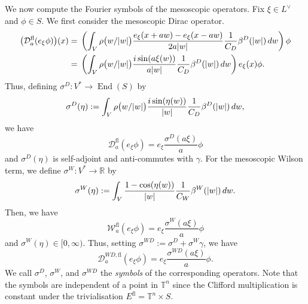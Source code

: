\documentclass[a4paper,oneside,12pt]{amsart}
\theoremstyle{plain}
\theoremstyle{definition}
\theoremstyle{remark}
\newcommand{\R}{\mathbb{R}}
\DeclarePairedDelimiter{\abs}{\lvert}{\rvert}
\DeclareMathOperator{\End}{End}
\newcommand{\flattorus}{\mathbb{T}^n}
\newcommand{\Lattice}{L}
\newcommand{\duallattice}[1]{#1^{\vee}}
\newcommand{\cliffordmultiplication}{\rho}
\newcommand{\mesoscopicDiracoperator}[1][a]{\mathcal{D}_{#1}}
\newcommand{\mesoscopicWilsonterm}[1][a]{\mathcal{W}_{#1}}
\newcommand{\cutoff}{\beta}
\newcommand{\cutoffDirac}{\cutoff^D}
\newcommand{\cutoffWilson}{\cutoff^W}
\newcommand{\symbolDirac}{\sigma^D}
\newcommand{\symbolWilson}{\sigma^W}
\newcommand{\symbolWilsonDirac}{\sigma^{\mathit{WD}}}
\newcommand{\flatmesoscopicDiracoperator}{\mesoscopicDiracoperator^{\mathrm{fl}}}
\newcommand{\flatmesoscopicWilsonterm}{\mesoscopicWilsonterm^{\mathrm{fl}}}
\newcommand{\flatmesoscopicWilsonDiracoperator}[1][a]{\mathcal{D}_{#1}^{\mathit{WD},\mathrm{fl}}}
\newcommand{\flatmodel}[1]{#1^{\mathrm{fl}}}
\begin{document}
We now compute the Fourier symbols of the mesoscopic operators.
Fix $\xi \in \duallattice{\Lattice}$ and $\phi \in S$.
We first consider the mesoscopic Dirac operator.
\begin{equation}
  \begin{aligned}
  \big(\flatmesoscopicDiracoperator (e_{\xi}\phi)\big)(x) ={}& \left(\int_V \cliffordmultiplication\big(w/\abs{w}\big) \frac{e_{\xi}(x+aw) - e_{\xi}(x-aw)}{2a\abs{w}} \frac{1}{C_D} \cutoffDirac(\abs{w}) \,dw\right) \phi \\
  ={}& \left(\int_V \cliffordmultiplication\big(w/\abs{w}\big) \frac{i \sin(a\xi(w))}{a\abs{w}} \frac{1}{C_D} \cutoffDirac(\abs{w}) \,dw\right) e_{\xi}(x)\phi.
  \end{aligned}
\end{equation}
Thus, defining $\symbolDirac \colon V^* \to \End(S)$ by
\begin{equation}
  \symbolDirac(\eta) := \int_V \cliffordmultiplication\big(w/\abs{w}\big) \frac{i \sin(\eta(w))}{\abs{w}} \frac{1}{C_D} \cutoffDirac(\abs{w}) \,dw,
\end{equation}
we have
\begin{equation}
  \flatmesoscopicDiracoperator (e_{\xi}\phi) = e_{\xi} \frac{\symbolDirac(a\xi)}{a} \phi
\end{equation}
and $\symbolDirac(\eta)$ is self-adjoint and anti-commutes with $\gamma$.
For the mesoscopic Wilson term, we define $\symbolWilson \colon V^* \to \R$ by
\begin{equation}
  \symbolWilson(\eta) := \int_V \frac{1 - \cos(\eta(w))}{\abs{w}} \frac{1}{C_W} \cutoffWilson(\abs{w}) \,dw.
\end{equation}
Then, we have
\begin{equation}
  \flatmesoscopicWilsonterm (e_{\xi}\phi) = e_{\xi} \frac{\symbolWilson(a\xi)}{a} \phi
\end{equation}
and $\symbolWilson(\eta) \in [0,\infty)$.
Thus, setting $\symbolWilsonDirac := \symbolDirac + \symbolWilson \gamma$, we have
\begin{equation}\label{equation: Fourier transform of mesoscopic WD operators}
  \flatmesoscopicWilsonDiracoperator (e_{\xi}\phi) = e_{\xi} \frac{\symbolWilsonDirac(a\xi)}{a} \phi.
\end{equation}
We call $\symbolDirac$, $\symbolWilson$, and $\symbolWilsonDirac$ the \emph{symbols} of the corresponding operators.
Note that the symbols are independent of a point in $\flattorus$ since the Clifford multiplication is constant under the trivialisation $\flatmodel{E}=\flattorus \times S$.
\end{document}
